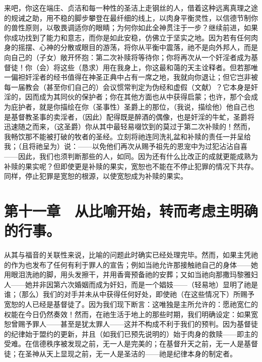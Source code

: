 来吧，你这在端庄、贞洁和每一种性的圣洁上走钢丝的人，借着这种远离真理之途的规诫之助，用不稳的脚步攀登在最纤细的线上，以肉身平衡灵性，以信德节制你的兽性原则，以敬畏调适你的眼睛；为何你如此全神贯注于一步？继续前进，如果你成功找到了能力和意志，而你是如此安稳，仿佛立于坚实之地。因为若有任何肉身的摇摆、心神的分散或眼目的游荡，将你从平衡中震落，祂不是向外邦人，而是向自己的（子女）敞开怀抱：第二次补赎将等待你；你将再次从一个奸淫者成为基督徒！你（会）将这些（恳求）用在我身上，你这最和蔼的天主诠释者。但若那唯一偏袒奸淫者的经书值得在神圣正典中占有一席之地，我就向你退让；但它岂非被每一届教会（甚至你们自己的）会议惯常判定为伪经和虚假（文献）？它本身是奸淫的，因而成为其同伙的保护者；你在其他方面也从中获得启蒙；也许，那个会成为庇护者，就是你描绘在你（圣事性）圣爵上的那位，（我说，描绘他）他自己也是基督教圣事的卖淫者，（因此）配得既是醉酒的偶像，也是奸淫的牛虻，圣爵将迅速随之而来，（这圣爵）你从其中最轻易啜饮到的莫过于第二次补赎的！然而，我畅饮那不能被打破的牧者的圣经。立刻将祂连同洗礼盆和补赎的责任一并呈给我；（且将祂呈为）说：——以免他们再次从赐予祖先的恩宠中为过犯沾沾自喜——因此，我们也须判断那些的人，如同。因为还有什么比改正的成就更能成熟为补赎的果实呢？但即使更是补赎的果实，宽恕也不能在不停止犯罪的情况下共存。同样，停止犯罪是宽恕的根源，以使宽恕成为补赎的果实。\par


\section{第十一章　从比喻开始，转而考虑主明确的行事。}

从其与福音的关联性来说，比喻的问题此时确实已经处理完毕。然而，如果主凭祂的作为也发布了任何有利于罪人的宣告；例如当祂允许那接触祂自己的身体——她用眼泪洗祂的脚，用头发擦干，并用香膏预备祂的安葬；又如当祂向那撒玛黎雅妇人——她并非因第六次婚姻而成为奸妇，而是一个娼妓——（轻易地）显明了祂是谁；（那么）我们的对手并未从中获得任何好处，即使祂（在这些情况下）所赐予宽恕的人已经是基督徒了。因为我们现下断言：这唯独是主所允许的：愿祂宽仁的权能在今日仍然奏效！然而，在祂生活于地上的那些时期，我们明确设定：如果宽恕曾赐予罪人——甚至是犹太罪人——这并不构成不利于我们的预判。因为基督徒的纪律始于盟约的更新，并且（如我们已预先说明的）始于肉身的救赎——即主的受难。在信德秩序被发现之前，无一人是完美的；在基督升天之前，无一人是基督徒；在圣神从天上显现之前，无一人是圣洁的——祂是纪律本身的制定者。\par

